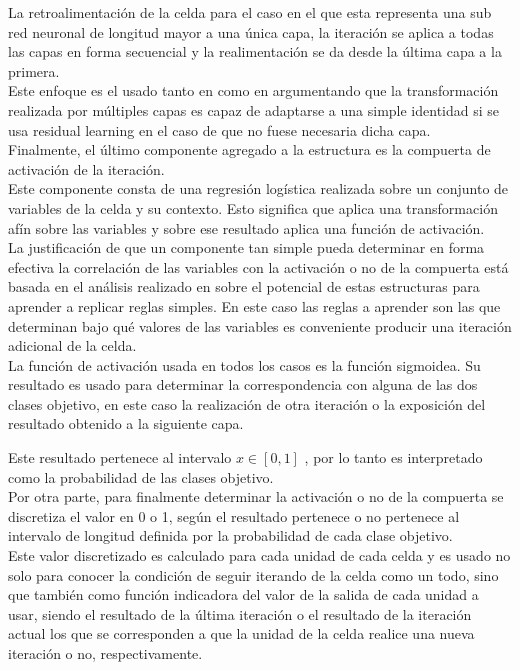 \documentclass{article}
\begin{document}
La retroalimentación de la celda para el caso en el que esta representa una sub red neuronal de longitud mayor a una única capa, la iteración se aplica a todas las capas en forma secuencial y la realimentación se da desde la última capa a la primera.\\

Este enfoque es el usado tanto en \cite{bringingTheGaps} como en \cite{loopyRNN} argumentando que la transformación realizada por múltiples capas es capaz de adaptarse a una simple identidad si se usa residual learning en el caso de que no fuese necesaria dicha capa.\\

Finalmente, el último componente agregado a la estructura es la compuerta de activación de la iteración.\\

Este componente consta de una regresión logística realizada sobre un conjunto de variables de la celda y su contexto. Esto significa que aplica una transformación afín sobre las variables y sobre ese resultado aplica una función de activación.\\

La justificación de que un componente tan simple pueda determinar en forma efectiva la correlación de las variables con la activación o no de la compuerta está basada en el análisis realizado en \cite{wideLearning} sobre el potencial de estas estructuras para aprender a replicar reglas simples. En este caso las reglas a aprender son las que determinan bajo qué valores de las variables es conveniente producir una iteración adicional de la celda.\\

La función de activación usada en todos los casos es la función sigmoidea. Su resultado es usado para determinar la correspondencia con alguna de las dos clases objetivo, en este caso la realización de otra iteración o la exposición del resultado obtenido a la siguiente capa.

Este resultado pertenece al intervalo \( x \in [0,1]\) , por lo tanto es interpretado como la probabilidad de las clases objetivo.\\

Por otra parte, para finalmente determinar la activación o no de la compuerta se discretiza el valor en 0 o 1, según el resultado pertenece o no pertenece al intervalo de longitud definida por la probabilidad de cada clase objetivo.\\

Este valor discretizado es calculado para cada unidad de cada celda y es usado no solo para conocer la condición de seguir iterando de la celda como un todo, sino que también como función indicadora del valor de la salida de cada unidad a usar, siendo el resultado de la última iteración o el resultado de la iteración actual los que se corresponden a que la unidad de la celda realice una nueva iteración o no, respectivamente.\\
\end{document}
